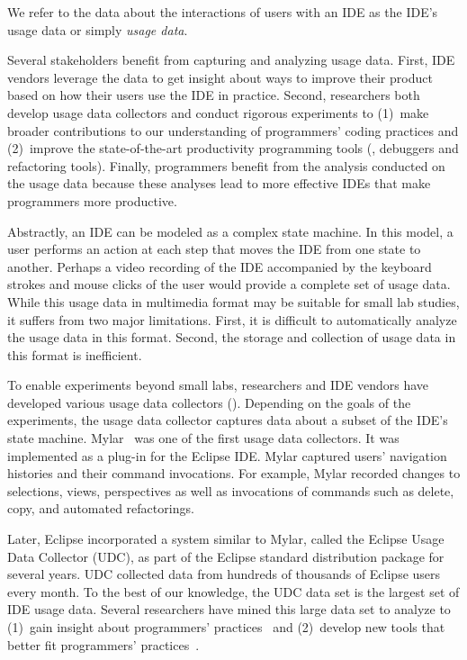 
We refer to the data about the interactions of users with an IDE as the IDE's
usage data or simply \emph{usage data}.

%
Several stakeholders benefit from capturing and analyzing usage data. First, IDE
vendors leverage the data to get insight about ways to improve their product
based on how their users use the IDE in practice. Second, researchers both
develop usage data collectors and conduct rigorous experiments to (1)~make
broader contributions to our understanding of programmers' coding practices and
(2)~improve the state-of-the-art productivity programming tools (\eg, debuggers
and refactoring tools). Finally, programmers benefit from the analysis conducted
on the usage data because these analyses lead to more effective IDEs that make
programmers more productive.

Abstractly, an IDE can be modeled as a complex state machine. In this model, a
user performs an action at each step that moves the IDE from one state to
another.
%
Perhaps a video recording of the IDE accompanied by the keyboard strokes and
mouse clicks of the user would provide a complete set of usage data.
%
While this usage data in multimedia format may be suitable for small lab
studies, it suffers from two major limitations. First, it is difficult to
automatically analyze the usage data in this format. Second, the storage and
collection of usage data in this format is inefficient.

To enable experiments beyond small labs, researchers and IDE vendors have
developed various usage data collectors ().
Depending on the goals of the experiments, the usage data collector captures
data about a subset of the IDE's state machine.
%
Mylar~\cite{V:Murphy2006How} was one of the first usage data collectors. It was
implemented as a plug-in for the Eclipse IDE. Mylar captured users' navigation
histories and their command invocations. For example, Mylar recorded changes to
selections, views, perspectives as well as invocations of commands such as
delete, copy, and automated refactorings.

Later, Eclipse incorporated a system similar to Mylar, called the Eclipse Usage
Data Collector (UDC), as part of the Eclipse standard
distribution package for several years. UDC collected data from hundreds of
thousands of Eclipse users every month. To the best of our knowledge, the UDC
data set is the largest set of IDE usage data.
Several researchers have mined this large data set to analyze to 
%
(1)~gain insight about programmers'
practices~\cite{VakilianJohnson2014Alternate, VakilianETAL2013Compositional,
V:MurphyHill2012How} and
%
(2)~develop new tools that better fit programmers'
practices~\cite{MurphyHill2012Improving, VakilianETAL2013Compositional,
Kersten-Mylar2005}.

